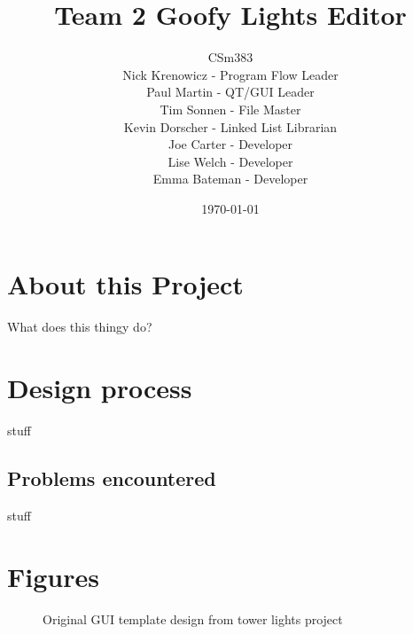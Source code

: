 \documentclass[11pt]{article} %
\title{\huge Team 2 Goofy Lights Editor}
\author{CSm383 \\
	Nick Krenowicz - Program Flow Leader \\
	Paul Martin - QT/GUI Leader\\ 
	Tim Sonnen - File Master \\
	Kevin Dorscher - Linked List Librarian \\
	Joe Carter - Developer \\
	Lise Welch - Developer \\
	Emma Bateman - Developer
	}
\date{\today} %
\begin{document}
\lstset{language=C++}
\maketitle
\pagebreak

\tableofcontents

\section{About this Project}
What does this thingy do?

\section{Design process}
stuff

\subsection{Problems encountered}
stuff


\newpage
\section{Figures}
  
  \begin{figure}[H]
  	\centering
  	\caption{Original GUI template design from tower lights project}
  	\label{fig:GUI Base Design Reference}
  \end{figure}
  
\end{document}
